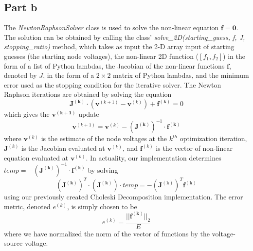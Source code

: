 \documentclass[11pt]{article}
\begin{document}
\FloatBarrier
\subsection*{Part b}
The \textit{NewtonRaphsonSolver} class is used to solve the non-linear equation $\mathbf{f} = \mathbf{0}$. The solution can be obtained by calling the class' \textit{solve\_2D(starting\_guess, f, J, stopping\_ratio)} method, which takes as input the 2-D array input of starting guesses (the starting node voltages), the non-linear 2D function ($[f_1, f_2]$) in the form of a list of Python lambdas, the Jacobian of the non-linear functions $\mathbf{f}$, denoted by $J$, in the form of a $2 \times 2$ matrix of Python lambdas, and the minimum error used as the stopping condition for the iterative solver. The Newton Raphson iterations are obtained by solving the equation
$$\mathbf{J^{(k)}} \cdot (\mathbf{v}^{(k+1)} - \mathbf{v}^{(k)}) + \mathbf{f^{(k)}} = 0$$
which gives the $\mathbf{v^{(k+1)}}$ update
$$\boxed{\mathbf{v}^{(k+1)} = \mathbf{v}^{(k)} - (\mathbf{J^{(k)}})^{-1} \cdot \mathbf{f^{(k)}}}$$
where $\mathbf{v}^{(k)}$ is the estimate of the node voltages at the $k^{th}$ optimization iteration, $\mathbf{J}^{(k)}$ is the Jacobian evaluated at $\mathbf{v}^{(k)}$, and $\mathbf{f}^{(k)}$ is the vector of non-linear equation evaluated at $\mathbf{v}^{(k)}$. In actuality, our implementation determines $temp = - (\mathbf{J^{(k)}})^{-1} \cdot \mathbf{f^{(k)}}$ by solving 
$$(\mathbf{J^{(k)}})^T \cdot (\mathbf{J^{(k)}}) \cdot temp = - (\mathbf{J^{(k)}})^T \mathbf{f^{(k)}}$$
using our previously created Choleski Decomposition implementation. The error metric, denoted $e^{(k)}$, is simply chosen to be
$$e^{(k)} = \frac{||\mathbf{f^{(k)}}||_2}{E}$$
where we have normalized the norm of the vector of functions by the voltage-source voltage.
\end{document}
